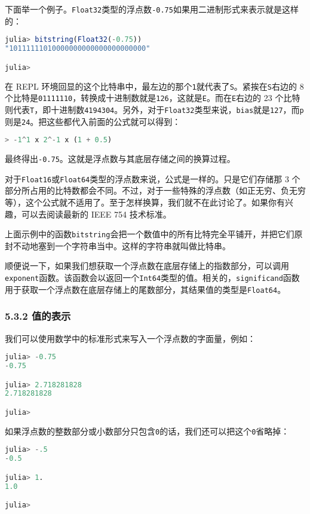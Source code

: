 下面举一个例子。\verb`Float32`类型的浮点数\verb`-0.75`如果用二进制形式来表示就是这样的：
\begin{lstlisting}[language=julia]
julia> bitstring(Float32(-0.75))
"10111111010000000000000000000000"

julia> 
\end{lstlisting}

在 REPL 环境回显的这个比特串中，最左边的那个\verb`1`就代表了\verb`S`。紧挨在\verb`S`右边的 8 个比特是\verb`01111110`，转换成十进制数就是\verb`126`，这就是\verb`E`。而在\verb`E`右边的 23 个比特则代表\verb`T`，即十进制数\verb`4194304`。另外，对于\verb`Float32`类型来说，\verb`bias`就是\verb`127`，而\verb`p`则是\verb`24`。把这些都代入前面的公式就可以得到：
\begin{lstlisting}[language=julia]
> -1^1 x 2^-1 x (1 + 0.5)
\end{lstlisting}
最终得出\verb`-0.75`。这就是浮点数与其底层存储之间的换算过程。

对于\verb`Float16`或\verb`Float64`类型的浮点数来说，公式是一样的。只是它们存储那 3 个部分所占用的比特数都会不同。不过，对于一些特殊的浮点数（如正无穷、负无穷等），这个公式就不适用了。至于怎样换算，我们就不在此讨论了。如果你有兴趣，可以去阅读最新的 IEEE 754 技术标准。

上面示例中的函数\verb`bitstring`会把一个数值中的所有比特完全平铺开，并把它们原封不动地塞到一个字符串当中。这样的字符串就叫做比特串。

顺便说一下，如果我们想获取一个浮点数在底层存储上的指数部分，可以调用\verb`exponent`函数。该函数会以返回一个\verb`Int64`类型的值。相关的，\verb`significand`函数用于获取一个浮点数在底层存储上的尾数部分，其结果值的类型是\verb`Float64`。

\subsubsection{5.3.2 值的表示}

我们可以使用数学中的标准形式来写入一个浮点数的字面量，例如：
\begin{lstlisting}[language=julia]
julia> -0.75
-0.75

julia> 2.718281828
2.718281828

julia> 
\end{lstlisting}

如果浮点数的整数部分或小数部分只包含\verb`0`的话，我们还可以把这个\verb`0`省略掉：
\begin{lstlisting}[language=julia]
julia> -.5
-0.5

julia> 1.
1.0

julia> 
\end{lstlisting}

